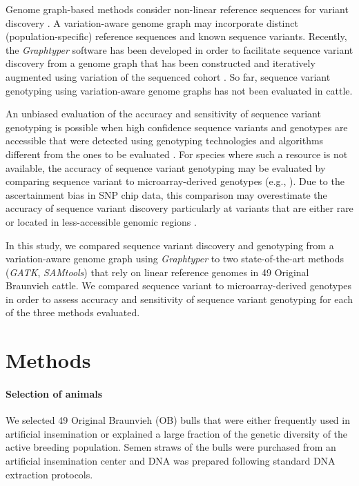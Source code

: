 \documentclass[../main.tex]{subfiles}
\begin{document}
Genome graph-based methods consider non-linear reference sequences for variant discovery \citep{rakocevic2019fast,eggertsson2017graphtyper,novak2017genome,garrison2018variation,sibbesen2018accurate}. A variation-aware genome graph may incorporate distinct (population-specific) reference sequences and known sequence variants. Recently, the \emph{Graphtyper} software has been developed in order to facilitate sequence variant discovery from a genome graph that has been constructed and iteratively augmented using variation of the sequenced cohort \citep{eggertsson2017graphtyper}. So far, sequence variant genotyping using variation-aware genome graphs has not been evaluated in cattle.

An unbiased evaluation of the accuracy and sensitivity of sequence variant genotyping is possible when high confidence sequence variants and genotypes are accessible that were detected using genotyping technologies and algorithms different from the ones to be evaluated \citep{li2018synthetic}. For species where such a resource is not available, the accuracy of sequence variant genotyping may be evaluated by comparing sequence variant to microarray-derived genotypes (e.g., \citep{Jansen2013,depristo2011framework}). Due to the ascertainment bias in SNP chip data, this comparison may overestimate the accuracy of sequence variant discovery particularly at variants that are either rare or located in less-accessible genomic regions \citep{li2014toward,malomane2018efficiency}.

In this study, we compared sequence variant discovery and genotyping from a variation-aware genome graph using \emph{Graphtyper} to two state-of-the-art methods (\emph{GATK}, \emph{SAMtools}) that rely on linear reference genomes in 49 Original Braunvieh cattle. We compared sequence variant to microarray-derived genotypes in order to assess accuracy and sensitivity of sequence variant genotyping for each of the three methods evaluated.

\section{Methods}
\label{chap2:met}

\paragraph{Selection of animals} 

We selected 49 Original Braunvieh (OB) bulls that were either frequently used in artificial insemination or explained a large fraction of the genetic diversity of the active breeding population. Semen straws of the bulls were purchased from an artificial insemination center and DNA was prepared following standard DNA extraction protocols.
\end{document}
